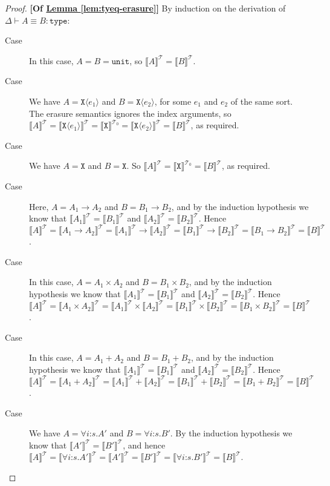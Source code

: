 \documentclass[natbib,preprint]{sigplanconf}
\newcommand{\sortType}{\texttt{type}}
\newcommand{\tyUnit}{\texttt{unit}}
\newcommand{\tyPrim}[2]{\texttt{#1}\langle #2 \rangle}
\newcommand{\tyPrimNm}[1]{\texttt{#1}}
\newcommand{\tyArr}{\to}
\newcommand{\tyProduct}{\times}
\newcommand{\tySem}[1]{\llbracket #1 \rrbracket^{\mathcal{T}}}
\newcommand{\tyPrimSem}[1]{\llbracket \tyPrimNm{#1} \rrbracket^{\mathcal{T}_0}}
\newcommand{\lemref}[1]{\hyperref[#1]{Lemma \ref*{#1}}}
\begin{document}
\begin{proof}\textbf{[Of \lemref{lem:tyeq-erasure}]}
  By induction on the derivation of $\Delta \vdash A \equiv B :
  \sortType$:
  \begin{description}
  \item[Case ] In this case, $A = B = \tyUnit$, so
    $\tySem{A} = \tySem{B}$.
  \item[Case ] We have $A = \tyPrim{X}{e_1}$ and
    $B = \tyPrim{X}{e_2}$, for some $e_1$ and $e_2$ of the same
    sort. The erasure semantics ignores the index arguments, so
    $\tySem{A} = \tySem{\tyPrim{X}{e_1}} = \tyPrimSem{X} =
    \tySem{\tyPrim{X}{e_2}} = \tySem{B}$, as required.
  \item[Case ] We have $A = \tyPrimNm{X}$ and
    $B = \tyPrimNm{X}$. So $\tySem{A} = \tyPrimSem{X} = \tySem{B}$, as
    required.
  \item[Case ] Here, $A = A_1 \tyArr A_2$ and $B =
    B_1 \tyArr B_2$, and by the induction hypothesis we know that
    $\tySem{A_1} = \tySem{B_1}$ and $\tySem{A_2} = \tySem{B_2}$. Hence
    $\tySem{A} = \tySem{A_1 \tyArr A_2} = \tySem{A_1} \to \tySem{A_2}
    = \tySem{B_1} \to \tySem{B_2} = \tySem{B_1 \tyArr B_2} =
    \tySem{B}$.
  \item[Case ] In this case, $A = A_1 \tyProduct
    A_2$ and $B = B_1 \tyProduct B_2$, and by the induction hypothesis
    we know that $\tySem{A_1} = \tySem{B_1}$ and $\tySem{A_2} =
    \tySem{B_2}$. Hence $\tySem{A} = \tySem{A_1 \tyProduct A_2} =
    \tySem{A_1} \times \tySem{A_2} = \tySem{B_1} \times \tySem{B_2} =
    \tySem{B_1 \tyProduct B_2} = \tySem{B}$.
  \item[Case ] In this case, $A = A_1 + A_2$ and $B =
    B_1 + B_2$, and by the induction hypothesis we know that
    $\tySem{A_1} = \tySem{B_1}$ and $\tySem{A_2} = \tySem{B_2}$. Hence
    $\tySem{A} = \tySem{A_1 + A_2} = \tySem{A_1} + \tySem{A_2} =
    \tySem{B_1} + \tySem{B_2} = \tySem{B_1 + B_2} = \tySem{B}$.
  \item[Case ] We have $A = \forall
    i\mathord:s.A'$ and $B = \forall i\mathord:s.B'$. By the induction
    hypothesis we know that $\tySem{A'} = \tySem{B'}$, and hence
    $\tySem{A} = \tySem{\forall i\mathord:s. A'} = \tySem{A'} =
    \tySem{B'} = \tySem{\forall i\mathord:s. B'} = \tySem{B}$.
  \end{description}
\end{proof}
\end{document}
